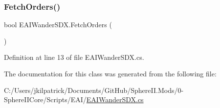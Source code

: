 \subsubsection{\texorpdfstring{FetchOrders()}{FetchOrders()}}
{\footnotesize\ttfamily bool E\+A\+I\+Wander\+S\+D\+X.\+Fetch\+Orders (\begin{DoxyParamCaption}{ }\end{DoxyParamCaption})}



Definition at line 13 of file E\+A\+I\+Wander\+S\+D\+X.\+cs.



The documentation for this class was generated from the following file\+:\begin{DoxyCompactItemize}
\item 
C\+:/\+Users/jkilpatrick/\+Documents/\+Git\+Hub/\+Sphere\+I\+I.\+Mods/0-\/\+Sphere\+I\+I\+Core/\+Scripts/\+E\+A\+I/\mbox{\hyperlink{_e_a_i_wander_s_d_x_8cs}{E\+A\+I\+Wander\+S\+D\+X.\+cs}}\end{DoxyCompactItemize}
